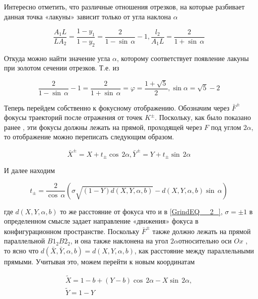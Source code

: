 \documentclass[a4paper]{article}
\begin{document}
Интересно отметить, что различные отношения отрезков, на которые разбивает данная точка «лакуны» зависит только от угла наклона $\alpha$

\begin{equation} \label{GrindEQ__5_} \frac{A_{1} L}{LA_{2} } =\frac{1-y_{1} }{1-y_{2} } =\frac{2}{1-\sin \, \alpha } -1 , \frac{l_{2} }{A_{1} L} =\frac{2}{1+\sin \, \alpha }  \end{equation}

Откуда можно найти значение угла $\alpha $, которому соответствует появление лакуны при золотом сечении отрезков. Т.е. из

\[\frac{2}{1-\sin \, \alpha } -1=\frac{2}{1+\sin \, \alpha } =\varphi =\frac{1+\sqrt{5} }{2} , \sin \alpha =\sqrt{5} -2\]

Теперь перейдем собственно к фокусному отображению. Обозначим через $\bar{F}^{\pm } $ фокусы траекторий после отражения от точек $K^{\pm } $. Поскольку, как было показано ранее \cite{Yanovskii2013}, эти фокусы должны лежать на прямой, проходящей через $F$ под углом $2\alpha $, то отображение можно переписать следующим образом.

\begin{equation} \label{GrindEQ__6_} \bar{X}^{\pm } =X+t_{\pm } \cos \, 2\alpha ,  \bar{Y}^{\pm } =Y+t_{\pm } \sin \, 2\alpha  \end{equation}

И далее находим

\begin{equation} \label{GrindEQ__7_}t_{\pm } =\frac{2}{\cos \, \alpha } \left(\sigma \sqrt{\left(1-Y\right)d\left(X,Y,\alpha ,b\right)} -d\left(X,Y,\alpha ,b\right)\sin \, \alpha \right) \end{equation}

где $d\left(X,Y,\alpha ,b\right)$ то же расстояние от фокуса что и в \eqref{GrindEQ__2_}, $\sigma =\pm 1$ в определенном смысле задает направление «движения» фокуса в конфигурационном пространстве. Поскольку $\bar{F}^{\pm } $ также должно лежать на прямой параллельной $B1_{2} B2_{2} $, и она также наклонена на угол $2\alpha $относительно оси $Ox$ , то ясно что $d\left(\bar{X},\bar{Y},\alpha ,b\right)=d\left(X,Y,\alpha ,b\right)$, как расстояние между параллельными прямыми. Учитывая это, можем перейти к новым координатам

\begin{equation} \label{GrindEQ__8_} \begin{array}{l} {\tilde{X}=1-b+\left(Y-b\right)\cos \, 2\alpha -X\sin \, 2\alpha ,} \\ {\tilde{Y}=1-Y} \end{array} \end{equation}
\end{document}
